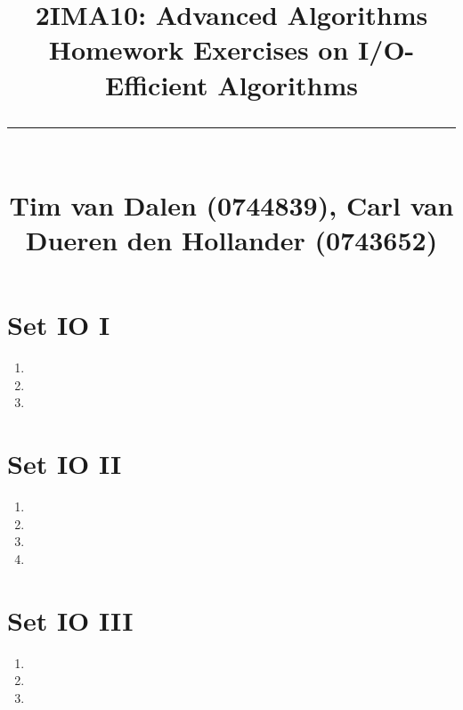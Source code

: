 \documentclass[a4paper,11pt]{article}
\title{
	\huge\raggedright 2IMA10: Advanced Algorithms \hfill\\{\Large Homework Exercises on I/O-Efficient Algorithms}\\ \vspace{-0.9\baselineskip}\rule{\linewidth}{1pt}\\
	\small\hfill Tim van Dalen (0744839), Carl van Dueren den Hollander (0743652)
	\normalsize
}
\begin{document}
	\maketitle

	\section*{Set IO I}
		\begin{enumerate}
			\item 
			\item 
			\item 
		\end{enumerate}
	\section*{Set IO II}
		\begin{enumerate}
			\item 
			\item 
			\item 
			\item 
		\end{enumerate}
	\section*{Set IO III}
		\begin{enumerate}
			\item 
			\item 
			\item 
		\end{enumerate}
\end{document}
